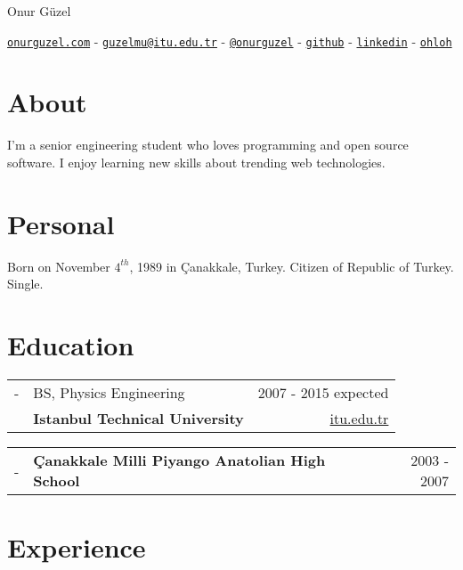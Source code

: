 \documentclass[11pt,a4paper]{article}
\author{\name}
\title{\cv}
\def\name{Onur Güzel}
\renewenvironment{itemize}{
  \begin{list}{}{
    \setlength{\leftmargin}{0em}
  }
}{
  \end{list}
}
\begin{document}

\begin{flushright}
\Huge \name
\end{flushright}

\begin{center}
\href{http://www.onurguzel.com/}{\tt onurguzel.com} - 
\href{mailto:guzelmu@itu.edu.tr}{\tt guzelmu@itu.edu.tr} - 
\href{http://onurguzel.com/twitter}{\tt @onurguzel} - 
\href{http://onurguzel.com/github}{\tt github} - 
\href{http://linkedin.com/in/guzelmu}{\tt linkedin} - 
\href{http://www.ohloh.net/accounts/onurguzel}{\tt ohloh}
\end{center}

\section*{About}
I'm a senior engineering student who loves programming and open source software. I enjoy learning new skills about trending web technologies.

\section*{Personal}
Born on November $4^{th}$, 1989 in Çanakkale, Turkey. Citizen of Republic of Turkey. Single.

\section*{Education}
\begin{itemize}
\item
\begin{tabularx}{\textwidth}{ l X r }
- & BS, Physics Engineering & 2007 - 2015 expected \\
& \textbf{Istanbul Technical University} & \href{http://www.itu.edu.tr/en/}{itu.edu.tr}
\end{tabularx}
\item
\begin{tabularx}{\textwidth}{l X r}
- & \textbf{Çanakkale Milli Piyango Anatolian High School} & 2003 - 2007
\end{tabularx}
\end{itemize}

\section*{Experience}
\end{document}
